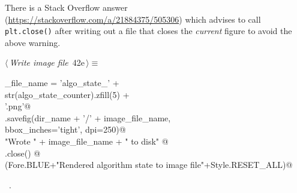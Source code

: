 \documentclass[11.5pt]{report}
\begin{document}
There is a  Stack Overflow answer (\url{https://stackoverflow.com/a/21884375/505306}) 
which advises to call \verb|plt.close()| after writing out a file that closes the 
\textit{current} figure to avoid the above warning. 
\begin{flushleft} \small\label{scrap58}\raggedright\small
{} $\langle\,${\itshape Write image file}\nobreak\ {\footnotesize {42e}}$\,\rangle\equiv$
\vspace{-1ex}
\begin{list}{}{} \item
\mbox{}\verb@image_file_name = 'algo_state_'                    +\@\\
\mbox{}\verb@                  str(algo_state_counter).zfill(5) +\@\\
\mbox{}\verb@                     '.png'@\\
\mbox{}\verb@plt.savefig(dir_name + '/' + image_file_name,  \@\\
\mbox{}\verb@            bbox_inches='tight', dpi=250)@\\
\mbox{}\verb@print "Wrote " + image_file_name + " to disk"   @\\
\mbox{}\verb@plt.close() @\\
\mbox{}\verb@debug(Fore.BLUE+"Rendered algorithm state to image file"+Style.RESET_ALL)@\\
\mbox{}\verb@@{\NWsep}
\end{list}
\vspace{-1.5ex}
\footnotesize
\begin{list}{}{\setlength{\itemsep}{-\parsep}\setlength{\itemindent}{-\leftmargin}}
\item \NWtxtMacroRefIn\ .

\item{}
\end{list}
\vspace{4ex}
\end{flushleft}
\end{document}
